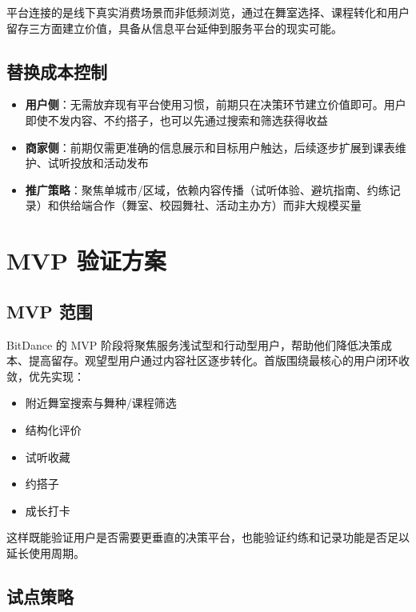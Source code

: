 \documentclass[12pt,a4paper]{ctexart}
\begin{document}
平台连接的是线下真实消费场景而非低频浏览，通过在舞室选择、课程转化和用户留存三方面建立价值，具备从信息平台延伸到服务平台的现实可能。

\subsection{替换成本控制}

\begin{itemize}
    \item \textbf{用户侧}：无需放弃现有平台使用习惯，前期只在决策环节建立价值即可。用户即使不发内容、不约搭子，也可以先通过搜索和筛选获得收益
    \item \textbf{商家侧}：前期仅需更准确的信息展示和目标用户触达，后续逐步扩展到课表维护、试听投放和活动发布
    \item \textbf{推广策略}：聚焦单城市/区域，依赖内容传播（试听体验、避坑指南、约练记录）和供给端合作（舞室、校园舞社、活动主办方）而非大规模买量
\end{itemize}

\section{MVP 验证方案}

\subsection{MVP 范围}
BitDance 的 MVP 阶段将聚焦服务浅试型和行动型用户，帮助他们降低决策成本、提高留存。观望型用户通过内容社区逐步转化。首版围绕最核心的用户闭环收敛，优先实现：

\begin{itemize}
    \item 附近舞室搜索与舞种/课程筛选
    \item 结构化评价
    \item 试听收藏
    \item 约搭子
    \item 成长打卡
\end{itemize}

这样既能验证用户是否需要更垂直的决策平台，也能验证约练和记录功能是否足以延长使用周期。

\subsection{试点策略}
\end{document}
